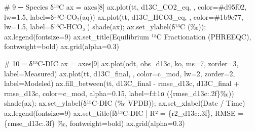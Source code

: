 \documentclass[
  letterpaper,
  DIV=11,
  numbers=noendperiod]{scrartcl}
\newenvironment{Shaded}{\begin{snugshade}}{\end{snugshade}}
\newcommand{\CommentTok}[1]{\textcolor[rgb]{0.37,0.37,0.37}{#1}}
\newcommand{\DecValTok}[1]{\textcolor[rgb]{0.68,0.00,0.00}{#1}}
\newcommand{\FloatTok}[1]{\textcolor[rgb]{0.68,0.00,0.00}{#1}}
\newcommand{\NormalTok}[1]{\textcolor[rgb]{0.00,0.23,0.31}{#1}}
\newcommand{\OperatorTok}[1]{\textcolor[rgb]{0.37,0.37,0.37}{#1}}
\newcommand{\SpecialCharTok}[1]{\textcolor[rgb]{0.37,0.37,0.37}{#1}}
\newcommand{\SpecialStringTok}[1]{\textcolor[rgb]{0.13,0.47,0.30}{#1}}
\newcommand{\StringTok}[1]{\textcolor[rgb]{0.13,0.47,0.30}{#1}}
\begin{document}
\begin{Shaded}
\begin{Highlighting}[]
\CommentTok{\# 9 ─ Species δ¹³C}
\NormalTok{ax }\OperatorTok{=}\NormalTok{ axes[}\DecValTok{8}\NormalTok{]}
\NormalTok{ax.plot(tt, d13C\_CO2\_eq, }\StringTok{\textquotesingle{}{-}\textquotesingle{}}\NormalTok{, color}\OperatorTok{=}\StringTok{\textquotesingle{}\#d95f02\textquotesingle{}}\NormalTok{, lw}\OperatorTok{=}\FloatTok{1.5}\NormalTok{, label}\OperatorTok{=}\StringTok{\textquotesingle{}δ¹³C{-}CO₂(aq)\textquotesingle{}}\NormalTok{)}
\NormalTok{ax.plot(tt, d13C\_HCO3\_eq, }\StringTok{\textquotesingle{}{-}\textquotesingle{}}\NormalTok{, color}\OperatorTok{=}\StringTok{\textquotesingle{}\#1b9e77\textquotesingle{}}\NormalTok{, lw}\OperatorTok{=}\FloatTok{1.5}\NormalTok{, label}\OperatorTok{=}\StringTok{\textquotesingle{}δ¹³C{-}HCO₃⁻\textquotesingle{}}\NormalTok{)}
\NormalTok{shade(ax)}\OperatorTok{;}\NormalTok{ ax.set\_ylabel(}\StringTok{\textquotesingle{}δ¹³C (‰)\textquotesingle{}}\NormalTok{)}\OperatorTok{;}\NormalTok{ ax.legend(fontsize}\OperatorTok{=}\DecValTok{9}\NormalTok{)}
\NormalTok{ax.set\_title(}\StringTok{\textquotesingle{}Equilibrium ¹³C Fractionation (PHREEQC)\textquotesingle{}}\NormalTok{, fontweight}\OperatorTok{=}\StringTok{\textquotesingle{}bold\textquotesingle{}}\NormalTok{)}
\NormalTok{ax.grid(alpha}\OperatorTok{=}\FloatTok{0.3}\NormalTok{)}

\CommentTok{\# 10 ─ δ¹³C{-}DIC}
\NormalTok{ax }\OperatorTok{=}\NormalTok{ axes[}\DecValTok{9}\NormalTok{]}
\NormalTok{ax.plot(odt, obs\_d13c, }\StringTok{\textquotesingle{}ko\textquotesingle{}}\NormalTok{, ms}\OperatorTok{=}\DecValTok{7}\NormalTok{, zorder}\OperatorTok{=}\DecValTok{3}\NormalTok{, label}\OperatorTok{=}\StringTok{\textquotesingle{}Measured\textquotesingle{}}\NormalTok{)}
\NormalTok{ax.plot(tt, d13C\_final, }\StringTok{\textquotesingle{}{-}\textquotesingle{}}\NormalTok{, color}\OperatorTok{=}\NormalTok{c\_mod, lw}\OperatorTok{=}\DecValTok{2}\NormalTok{, zorder}\OperatorTok{=}\DecValTok{2}\NormalTok{, label}\OperatorTok{=}\StringTok{\textquotesingle{}Modeled\textquotesingle{}}\NormalTok{)}
\NormalTok{ax.fill\_between(tt, d13C\_final }\OperatorTok{{-}}\NormalTok{ rmse\_d13c, d13C\_final }\OperatorTok{+}\NormalTok{ rmse\_d13c,}
\NormalTok{                color}\OperatorTok{=}\NormalTok{c\_mod, alpha}\OperatorTok{=}\FloatTok{0.15}\NormalTok{, label}\OperatorTok{=}\SpecialStringTok{f\textquotesingle{}±1σ (}\SpecialCharTok{\{}\NormalTok{rmse\_d13c}\SpecialCharTok{:.2f\}}\SpecialStringTok{‰)\textquotesingle{}}\NormalTok{)}
\NormalTok{shade(ax)}\OperatorTok{;}\NormalTok{ ax.set\_ylabel(}\StringTok{\textquotesingle{}δ¹³C{-}DIC (‰ VPDB)\textquotesingle{}}\NormalTok{)}\OperatorTok{;}\NormalTok{ ax.set\_xlabel(}\StringTok{\textquotesingle{}Date / Time\textquotesingle{}}\NormalTok{)}
\NormalTok{ax.legend(fontsize}\OperatorTok{=}\DecValTok{9}\NormalTok{)}
\NormalTok{ax.set\_title(}\SpecialStringTok{f\textquotesingle{}δ¹³C{-}DIC | R² = }\SpecialCharTok{\{}\NormalTok{r2\_d13c}\SpecialCharTok{:.3f\}}\SpecialStringTok{, RMSE = }\SpecialCharTok{\{}\NormalTok{rmse\_d13c}\SpecialCharTok{:.3f\}}\SpecialStringTok{ ‰\textquotesingle{}}\NormalTok{,}
\NormalTok{             fontweight}\OperatorTok{=}\StringTok{\textquotesingle{}bold\textquotesingle{}}\NormalTok{)}
\NormalTok{ax.grid(alpha}\OperatorTok{=}\FloatTok{0.3}\NormalTok{)}


\end{Highlighting}
\end{Shaded}
\end{document}
